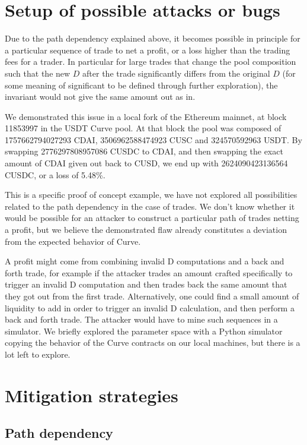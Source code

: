 \documentclass{article}
\begin{document}
{{{{    \section{Setup of possible attacks or bugs}

    Due to the path dependency explained above, it becomes possible in principle for a particular sequence of trade to net a profit, or a loss higher than the trading fees for a trader. In particular for large trades that change the pool composition such that the new $D$ after the trade significantly differs from the original $D$ (for some meaning of significant to be defined through further exploration), the invariant would not give the same amount out as in. 
    
    We demonstrated this issue in a local fork of the Ethereum mainnet, at block 11853997 in the USDT Curve pool. At that block the pool was composed of 1757662794027293 CDAI,  3506962588474923 CUSC and 324570592963 USDT. By swapping 2776297808957086 CUSDC to CDAI, and then swapping the exact amount of CDAI given out back to CUSD, we end up with 2624090423136564 CUSDC, or a loss of 5.48\%. 

    This is a specific proof of concept example, we have not explored all possibilities related to the path dependency in the case of trades. We don't know whether it would be possible for an attacker to construct a particular path of trades netting a profit, but we believe the demonstrated flaw already constitutes a deviation from the expected behavior of Curve. 

    A profit might come from combining invalid D computations and a back and forth trade, for example if the attacker trades an amount crafted specifically to trigger an invalid D computation and then trades back the same amount that they got out from the first trade. Alternatively, one could find a small amount of liquidity to add in order to trigger an invalid D calculation, and then perform a back and forth trade. The attacker would have to mine such sequences in a simulator. We briefly explored the parameter space with a Python simulator copying the behavior of the Curve contracts on our local machines, but there is a lot left to explore. 

    \section{Mitigation strategies}

    \subsection{Path dependency}

}}}}
\end{document}
